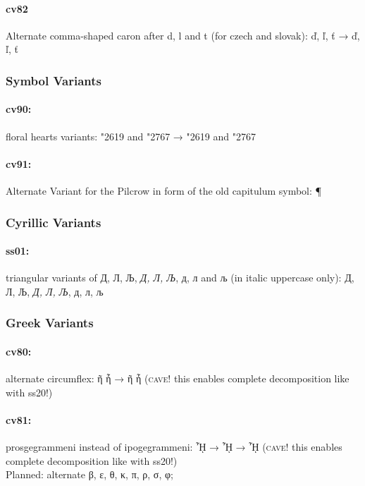 \documentclass[pagesize,DIV14]{scrartcl}
\begin{document}
\paragraph*{cv82} Alternate comma-shaped caron after d, l and t (for czech and slovak): ď, ľ, ť → {ď, ľ, ť}

\subsubsection{Symbol Variants}
\paragraph*{cv90:} floral hearts variants: \char"2619{}  and \char"2767{}  → {\char"2619{} and \char"2767}

\paragraph*{cv91:} Alternate Variant for the Pilcrow in form of the old capitulum symbol: {¶}

\subsubsection{Cyrillic Variants}
\paragraph*{ss01:} triangular variants of Д, Л, Љ, \textit{Д, Л, Љ}, д, л and љ (in italic uppercase only): { Д, Л, Љ, \textit{Д, Л, Љ}, д, л, љ 
}
{
\subsubsection{Greek Variants}
\paragraph*{cv80:} alternate circumflex: ῆ ἧ → {ῆ ἧ} (\textsc{cave!} this enables complete decomposition like with ss20!)
\paragraph*{cv81:} prosgegrammeni instead of ipogegrammeni: ᾞ → { ᾞ} → { ᾞ} (\textsc{cave!} this enables complete decomposition like with ss20!)\\
Planned: alternate β, ε, θ, κ, π, ρ, σ, φ;\\
}
\end{document}
